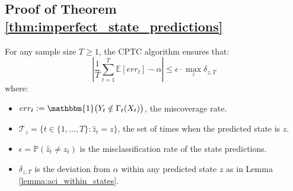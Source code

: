 \subsection{Proof of Theorem \ref{thm:imperfect_state_predictions}}
\begin{theorem*} 
For any sample size \( T \geq 1 \), the CPTC algorithm ensures that:
\[
\left| \frac{1}{T} \sum_{t=1}^{T} \mathbb{E}[err_t]  - \alpha \right| \leq \epsilon \cdot \max_z \delta_{z,T}
\]
where:
\begin{itemize}
    \item \(err_t := \mathbbm{1}\big(Y_t \notin \Gamma_{t}(X_t)\big)\), the miscoverage rate. 
    \item \( \mathcal{T}_z = \{ t \in \{1, \dots, T\} : \hat{z}_t = z \} \), the set of times when the predicted state is \( z \).
    \item \( \epsilon = \mathbb{P}(\hat{z}_t \neq z_t) \) is the misclassification rate of the state predictions.
    \item \( \delta_{z,T} \) is the deviation from \( \alpha \) within any predicted state $z$ as in  Lemma \ref{lemma:aci_within_states}. %
\end{itemize}
\end{theorem*}

 

